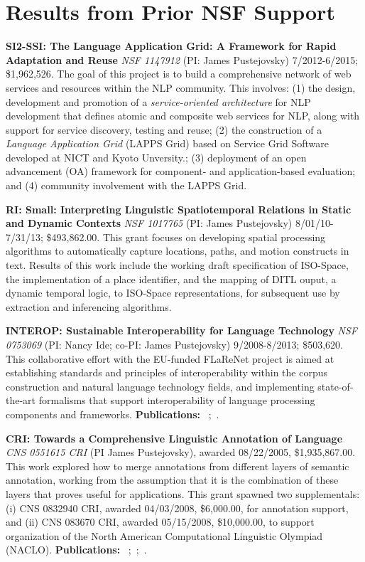 \documentclass[10pt]{article}
\newcommand{\miniskip}{\vspace*{1mm}}
\begin{document}
\vspace {-5mm}
\section{Results from Prior NSF Support}

\vspace {-3mm}

\noindent
 {\bf SI2-SSI: The Language Application Grid: A Framework for Rapid Adaptation and Reuse} 
{\it NSF 1147912} (PI: James Pustejovsky) 7/2012-6/2015; \$1,962,526.
The goal of this  project is to  build  a comprehensive network of web services and resources within the NLP community. This involves:
(1) the design, development  and promotion of a {\it service-oriented architecture} for NLP development that defines atomic and composite web services for NLP, along with support for service discovery, testing and reuse; (2)  the construction of a {\it Language Application Grid} (LAPPS Grid) based on Service Grid Software developed at NICT and Kyoto Unversity.; (3)  deployment of an open advancement (OA) framework for
component- and application-based evaluation; and  (4)   community involvement with the LAPPS Grid.  

\noindent
 {\bf 
RI: Small: Interpreting Linguistic Spatiotemporal Relations in Static and Dynamic Contexts}
{\it NSF 1017765} (PI: James Pustejovsky)  8/01/10-7/31/13; 
\$493,862.00. This grant focuses on developing spatial processing algorithms  to automatically capture locations, paths, and motion constructs in text.  Results of this work include the working draft specification of ISO-Space, the implementation of a place identifier, and the mapping of DITL ouput, a dynamic temporal logic, to ISO-Space representations, for subsequent use by extraction and inferencing algorithms. 

\noindent
{\bf INTEROP: Sustainable Interoperability for Language Technology} 
{\it NSF 0753069} (PI: Nancy Ide; co-PI: James Pustejovsky) 9/2008-8/2013; \$503,620.
This collaborative effort with the EU-funded FLaReNet project is aimed at establishing standards and principles of interoperability within the corpus construction and natural language technology fields, and implementing state-of-the-art formalisms that support interoperability of language processing components and frameworks.  {\bf Publications: }~\cite{idesuderman09};~\cite{ide-bunt:2010:LAW-IV}.

\noindent
{\bf CRI: Towards a Comprehensive Linguistic Annotation of Language} {\it CNS 0551615 CRI} (PI James Pustejovsky), awarded 08/22/2005, \$1,935,867.00. This work explored how to merge annotations from different layers of semantic annotation, working from the assumption that it is the combination of these layers that proves useful for applications. This grant spawned two supplementals: (i) CNS 0832940 CRI, awarded 04/03/2008, \$6,000.00, for annotation support, and (ii) CNS 083670 CRI, awarded 05/15/2008, \$10,000.00, to support organization of the North American Computational Linguistic Olympiad (NACLO). {\bf Publications: }~\cite{verhagen-stubbs-pustejovsky:2007:LAW};~\cite{verhagen-EtAl:2007:SemEval-2007};~\cite{verhagen-pustejovsky:2007:Interoperability}.
\end{document}

